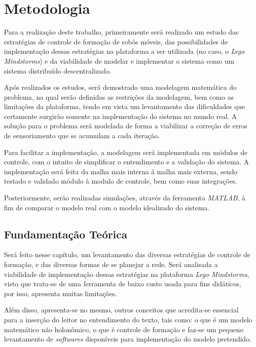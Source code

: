 %
%

\chapter{Metodologia}

Para a realização deste trabalho, primeiramente será realizado um estudo das estratégias de controle de formação de robôs móveis, das possibilidades %
de implementação dessas estratégias na plataforma a ser utilizada (no caso, o \emph{Lego Mindstorms\textregistered}) e da viabilidade de modelar e implementar o sistema como um sistema distribuído descentralizado. 

Após realizados os estudos, será demostrado uma modelagem matemática do problema, na qual serão definidas as restrições da modelagem, bem como as limitações da plataforma, tendo em vista um levantamento das dificuldades que certamente surgirão somente na implementação do sistema no mundo real. A solução para o problema será modelada de forma a viabilizar a correção de erros de sensoriamento que se acumulam a cada iteração.

Para facilitar a implementação, a modelagem será implementada em módulos de controle, com o intuito de simplificar o entendimento e a validação do sistema. A implementação será feita da malha mais interna à malha mais externa, sendo testado e validado módulo à modulo de controle, bem como suas integrações. 

Posteriormente, serão realizadas simulações, através da ferramenta \emph{MATLAB\textregistered}, à fim de comparar o modelo real com o modelo idealizado do sistema.

\section{Fundamentação Teórica}

Será feito nesse capítulo, um levantamento das diversas estratégias de controle de formação, e das diversas formas de se planejar a rede. Será analisada a viabilidade de implementação dessas estratégias na plataforma \emph{Lego Mindstorms\textregistered}, visto que trata-se de uma ferramenta de baixo custo usada para fins didáticos, por isso, apresenta muitas limitações.

Além disso, apresenta-se no mesmo, outros conceitos que acredita-se essencial para a inserção do leitor no entendimento do texto, tais como: o que é um modelo matemático não holonômico, o que é controle de formação e faz-se um pequeno levantamento de \emph{softwares} disponíveis para implementação do modelo pretendido. 

